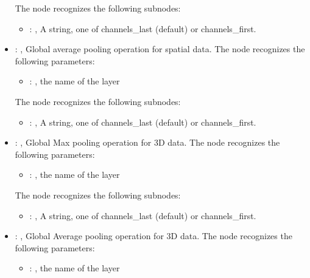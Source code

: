 \begin{itemize}
      The  node recognizes the following subnodes:
      \begin{itemize}
        \item {}: , 
          A string, one of channels\_last (default) or channels\_first.
      \end{itemize}

    \item {}: , 
      Global average pooling operation for spatial data.
      The  node recognizes the following parameters:
        \begin{itemize}
          \item {}: , 
            the name of the layer
      \end{itemize}

      The  node recognizes the following subnodes:
      \begin{itemize}
        \item {}: , 
          A string, one of channels\_last (default) or channels\_first.
      \end{itemize}

    \item {}: , 
      Global Max pooling operation for 3D data.
      The  node recognizes the following parameters:
        \begin{itemize}
          \item {}: , 
            the name of the layer
      \end{itemize}

      The  node recognizes the following subnodes:
      \begin{itemize}
        \item {}: , 
          A string, one of channels\_last (default) or channels\_first.
      \end{itemize}

    \item {}: , 
      Global Average pooling operation for 3D data.
      The  node recognizes the following parameters:
        \begin{itemize}
          \item {}: , 
            the name of the layer
      \end{itemize}


\end{itemize}
